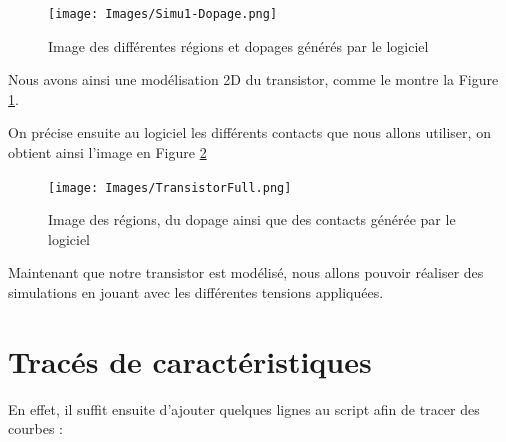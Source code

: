 \documentclass[a4paper,11pt]{report}
\begin{document}
\begin{figure}[H]
\centering
\texttt{[image: Images/Simu1-Dopage.png]}
\caption{Image des différentes régions et dopages générés par le logiciel}
\label{transistortonyplot}
\end{figure}

Nous avons ainsi une modélisation 2D du transistor, comme le montre la Figure \ref{transistortonyplot}.

On précise ensuite au logiciel les différents contacts que nous allons utiliser, on obtient ainsi l'image en Figure \ref{TransistorFull}

\begin{figure}[H]
    \centering
    \texttt{[image: Images/TransistorFull.png]}
    \caption{Image des régions, du dopage ainsi que des contacts générée par le logiciel}
    \label{TransistorFull}
\end{figure}

Maintenant que notre transistor est modélisé, nous allons pouvoir réaliser des simulations en jouant avec les différentes tensions appliquées.

\section{Tracés de caractéristiques}

En effet, il suffit ensuite d'ajouter quelques lignes au script afin de tracer des courbes :

\begin{code}[H]
\noindent{}
\caption{Mise en place des simulations}
\end{code}
\end{document}

